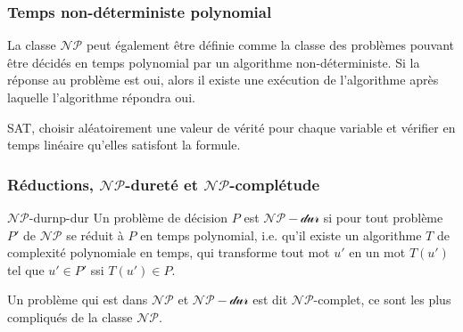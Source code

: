 \subsubsection{Temps non-déterministe polynomial}
\label{sub:temps_non_deterministe_polynomial}
La classe $\mathcal{NP}$ peut également être définie comme la classe des problèmes pouvant être décidés en temps polynomial
par un algorithme non-déterministe. Si la réponse au problème est oui, alors il existe une exécution de l'algorithme après 
laquelle l'algorithme répondra oui.
\begin{example}
    SAT, choisir aléatoirement une valeur de vérité pour chaque variable et vérifier en temps linéaire qu'elles satisfont
    la formule.
\end{example}

\subsubsection{Réductions, $\mathcal{NP}$-dureté et $\mathcal{NP}$-complétude}
\label{sub:reductions_np_durete_et_np_completude}
\begin{definition}{$\mathcal{NP}$-dur}{np-dur}
    Un problème de décision $P$ est $\mathcal{NP-dur}$ si pour tout problème $P'$ de $\mathcal{NP}$ se réduit à $P$ en temps
    polynomial, i.e. qu'il existe un algorithme $T$ de complexité polynomiale en temps, qui transforme tout mot $u'$ en un 
    mot $T(u')$ tel que $u'\in P'$ ssi $T(u')\in P$.
\end{definition}
Un problème qui est dans $\mathcal{NP}$ et $\mathcal{NP-dur}$ est dit $\mathcal{NP}$-complet, ce sont les plus compliqués de
la classe $\mathcal{NP}$.


